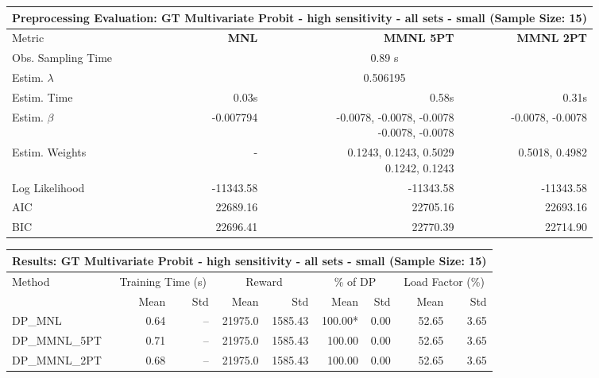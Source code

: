 
\begin{samepage}
\begin{center}
  \small
  \begin{tabular}{l|r|r|r}
    \toprule
    \multicolumn{4}{c}{\textbf{Preprocessing Evaluation: GT Multivariate Probit - high sensitivity - all sets - small (Sample Size: 15)}} \\
    \midrule
    Metric & \textbf{MNL} & \textbf{MMNL 5PT} & \textbf{MMNL 2PT} \\
    \midrule
    Obs. Sampling Time & \multicolumn{3}{c}{0.89 s} \\
    Estim. $\lambda$ & \multicolumn{3}{c}{0.506195} \\
    Estim. Time & 0.03s & 0.58s & 0.31s \\
    Estim. $\beta$ & -0.007794 & \makecell[tr]{-0.0078, -0.0078, -0.0078 \\ -0.0078, -0.0078} & -0.0078, -0.0078 \\
    Estim. Weights & - & \makecell[tr]{0.1243, 0.1243, 0.5029 \\ 0.1242, 0.1243} & 0.5018, 0.4982 \\
    Log Likelihood & -11343.58 & -11343.58 & -11343.58 \\
    AIC & 22689.16 & 22705.16 & 22693.16 \\
    BIC & 22696.41 & 22770.39 & 22714.90 \\
    \bottomrule
  \end{tabular}
\end{center}
\begin{center}
  \small
  \begin{tabular}{l|rr|rr|rr|rr}
    \toprule
    \multicolumn{9}{c}{\textbf{Results: GT Multivariate Probit - high sensitivity - all sets - small (Sample Size: 15)}} \\
    \midrule
    Method & \multicolumn{2}{c|}{Training Time (s)} & \multicolumn{2}{c|}{Reward} & \multicolumn{2}{c|}{\% of DP} & \multicolumn{2}{c}{Load Factor (\%)} \\
    & Mean & Std & Mean & Std & Mean & Std & Mean & Std \\
    \midrule
    DP\_MNL      &     0.64 &    -- &    21975.0 &    1585.43 & 100.00* &    0.00 &   52.65 &    3.65 \\
    DP\_MMNL\_5PT &     0.71 &    -- &    21975.0 &    1585.43 &  100.00 &    0.00 &   52.65 &    3.65 \\
    DP\_MMNL\_2PT &     0.68 &    -- &    21975.0 &    1585.43 &  100.00 &    0.00 &   52.65 &    3.65 \\

\end{tabular}
\end{center}
\end{samepage}
